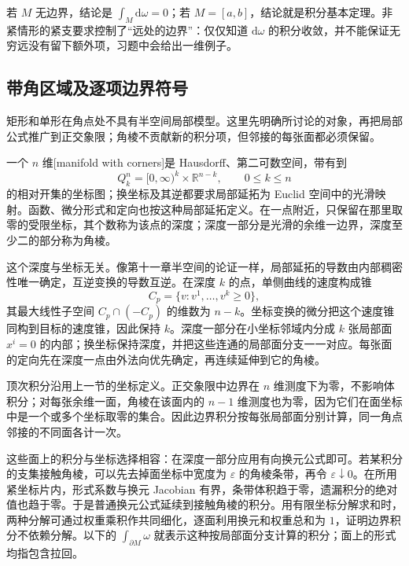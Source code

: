 若 \(M\) 无边界，结论是 \(\int_M\mathrm{d}\omega=0\)；若 \(M=[a,b]\)，结论就是积分基本定理。非紧情形的紧支要求控制了“远处的边界”：仅仅知道 \(\mathrm{d}\omega\) 的积分收敛，并不能保证无穷远没有留下额外项，习题中会给出一维例子。

\subsection{带角区域及逐项边界符号}
\label{g1:subsec:1404:04}

矩形和单形在角点处不具有半空间局部模型。这里先明确所讨论的对象，再把局部公式推广到正交象限；角棱不贡献新的积分项，但邻接的每张面都必须保留。

\begin{definition}\label{g1:def:manifold-with-corners}
	一个 \(n\) 维[manifold with corners]是 Hausdorff、第二可数空间，带有到
	\[
		Q_k^n=[0,\infty)^k\times\mathbb R^{n-k},
		\qquad 0\le k\le n
	\]
	的相对开集的坐标图；换坐标及其逆都要求局部延拓为 Euclid 空间中的光滑映射。函数、微分形式和定向也按这种局部延拓定义。在一点附近，只保留在那里取零的受限坐标，其个数称为该点的深度；深度一部分是光滑的余维一边界，深度至少二的部分称为角棱。
\end{definition}

这个深度与坐标无关。像第十一章半空间的论证一样，局部延拓的导数由内部稠密性唯一确定，互逆变换的导数互逆。在深度 \(k\) 的点，单侧曲线的速度构成锥
\[
	C_p=\{v:v^1,\ldots,v^k\ge0\},
\]
其最大线性子空间 \(C_p\cap(-C_p)\) 的维数为 \(n-k\)。坐标变换的微分把这个速度锥同构到目标的速度锥，因此保持 \(k\)。深度一部分在小坐标邻域内分成 \(k\) 张局部面 \(x^i=0\) 的内部；换坐标保持深度，并把这些连通的局部面分支一一对应。每张面的定向先在深度一点由外法向优先确定，再连续延伸到它的角棱。

\ProseParagraphBreak

顶次积分沿用上一节的坐标定义。正交象限中边界在 \(n\) 维测度下为零，不影响体积分；对每张余维一面，角棱在该面内的 \(n-1\) 维测度也为零，因为它们在面坐标中是一个或多个坐标取零的集合。因此边界积分按每张局部面分别计算，同一角点邻接的不同面各计一次。

\ProseParagraphBreak

这些面上的积分与坐标选择相容：在深度一部分应用有向换元公式即可。若某积分的支集接触角棱，可以先去掉面坐标中宽度为 \(\varepsilon\) 的角棱条带，再令 \(\varepsilon\downarrow0\)。在所用紧坐标片内，形式系数与换元 Jacobian 有界，条带体积趋于零，遗漏积分的绝对值也趋于零。于是普通换元公式延续到接触角棱的积分。用有限坐标分解求和时，两种分解可通过权重乘积作共同细化，逐面利用换元和权重总和为 \(1\)，证明边界积分不依赖分解。以下的 \(\int_{\partial M}\omega\) 就表示这种按局部面分支计算的积分；面上的形式均指包含拉回。

